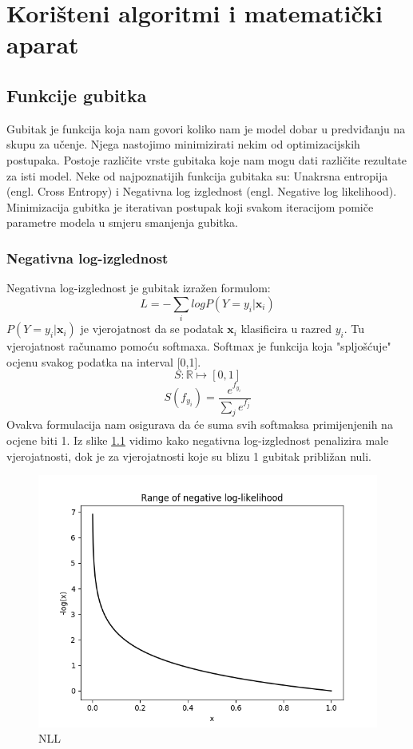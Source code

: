 \chapter{Korišteni algoritmi i matematički aparat}

\section{Funkcije gubitka}

Gubitak je funkcija koja nam govori koliko nam je model dobar u predviđanju na skupu za učenje. Njega nastojimo minimizirati nekim od optimizacijskih postupaka. Postoje različite vrste gubitaka koje nam mogu dati različite rezultate za isti model. Neke od najpoznatijih funkcija gubitaka su: Unakrsna entropija (engl. Cross Entropy) i Negativna log izglednost (engl. Negative log likelihood). Minimizacija gubitka je iterativan postupak koji svakom iteracijom pomiče parametre modela u smjeru smanjenja gubitka.

\subsection{Negativna log-izglednost}
	Negativna log-izglednost je gubitak izražen formulom:
	\[
		L = -\sum_{i}log P(Y = y_i | \textbf{x}_i)
	\]
	$P(Y = y_i | \textbf{x}_i)$ je vjerojatnost da se podatak $\textbf{x}_i$ klasificira u razred $y_i$.
	Tu vjerojatnost računamo pomoću softmaxa. Softmax je funkcija koja "spljošćuje" ocjenu svakog podatka na interval [0,1].
	\[
	S : \mathbb{R} \mapsto [0,1]
	\]
	\[
	S(f_{y_i}) = \frac{e^{f_{y_i}}}{\sum_{j} e^{f_j}}
	\]
	Ovakva formulacija nam osigurava da će suma svih softmaksa primijenjenih na ocjene biti 1. Iz slike \ref{fig:NLL} vidimo kako negativna log-izglednost penalizira male vjerojatnosti, dok je za vjerojatnosti koje su blizu 1 gubitak približan nuli.
	\begin{figure}[H]
		\centering\includegraphics[scale=0.5]{slike/neg_log.png}
		\caption{NLL}
		\label{fig:NLL}
	\end{figure}

